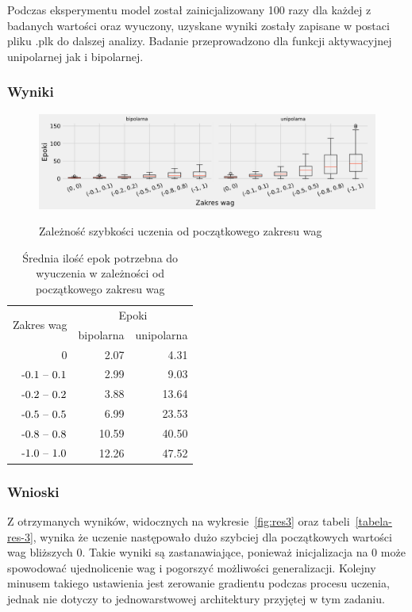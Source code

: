 \documentclass{article}
\begin{document}
Podczas eksperymentu model został zainicjalizowany 100 razy dla każdej z badanych wartości oraz wyuczony, uzyskane wyniki zostały zapisane w postaci pliku .plk do dalszej analizy. Badanie przeprowadzono dla funkcji aktywacyjnej unipolarnej jak i bipolarnej.

\subsubsection*{Wyniki}
\begin{figure}[!h]
	\centering
	\caption{Zależność szybkości uczenia od początkowego zakresu wag}
	\includegraphics[width=\textwidth]{per_w.png}
	\label{fig:res2}
\end{figure}

\begin{table}[!h]
	\caption{Średnia ilość epok potrzebna do wyuczenia w zależności od początkowego zakresu wag}
	\label{tabela-res-2}
	\centering
	\begin{tabular}{rrr}
		\toprule
		\multirow{2}{*}{Zakres wag}   & \multicolumn{2}{c}{Epoki} \\
		                  & bipolarna & unipolarna \\
		\midrule
		0                 & 2.07      & 4.31       \\
		\($-0.1 -- 0.1$\) & 2.99      & 9.03       \\
		\($-0.2 -- 0.2$\) & 3.88      & 13.64      \\
		\($-0.5 -- 0.5$\) & 6.99      & 23.53      \\
		\($-0.8 -- 0.8$\) & 10.59     & 40.50      \\
		\($-1.0 -- 1.0$\) & 12.26     & 47.52      \\
		\bottomrule
	\end{tabular}
\end{table}

\subsubsection*{Wnioski}

Z otrzymanych wyników, widocznych na wykresie~\ref{fig:res3} oraz tabeli~\ref{tabela-res-3}, wynika że uczenie następowało dużo szybciej dla początkowych wartości wag bliższych 0. Takie wyniki są zastanawiające, ponieważ inicjalizacja na 0 może spowodować ujednolicenie wag i pogorszyć możliwości generalizacji. Kolejny  minusem takiego ustawienia jest zerowanie gradientu podczas procesu uczenia, jednak nie dotyczy to jednowarstwowej architektury przyjętej w tym zadaniu. 
\end{document}
